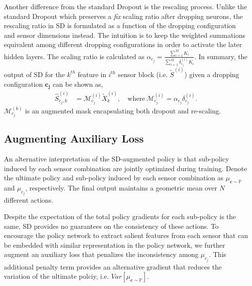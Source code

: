 \documentclass[../thesis.tex]{subfiles}
\begin{document}
Another difference from the standard Dropout is the rescaling process. Unlike the standard Dropout which preserves a \textit{fix} scaling ratio after dropping neurons, the rescaling ratio in SD is formulated as a function of the dropping configuration and sensor dimensions instead. The intuition is to keep the weighted summations equivalent among different dropping configurations in order to activate the later hidden layers. The scaling ratio is calculated as $\alpha_{c_j} = \frac{\sum_{i=1}^M K_i }{\sum_{i=1}^M \delta_{c_j}^{(i)} K_i}.$ In summary, the output of SD for the $k^{th}$ feature in $i^{th}$ sensor block (i.e. $\tilde{S}^{(i)}$) given a dropping configuration $\mathbf{c_j}$ can be shown as,
\begin{align}
\hat{S}^{(i)}_{{c_j},k} &= \mathcal{M}^{(i)}_{c_j} \tilde{X}_k^{(i)}, \ 
&\text{where} \ \mathcal{M}^{(i)}_{c_j} = \alpha_{c_j} \delta_{c_j}^{(i)}. 
\end{align}
$\mathcal{M}^{(k)}_{c_j}$ is an augmented mask encapsulating both dropout and re-scaling. 
 
\subsection{Augmenting Auxiliary Loss}

An alternative interpretation of the SD-augmented policy is that sub-policy induced by each sensor combination are jointly optimized during training. Denote the ultimate policy and sub-policy induced by each sensor combination as $\mu_{\mathbf{c}\sim \mathbb{P}}$ and $\mu_{c_j}$, respectively. The final output maintains a geometric mean over $N$ different actions. 

Despite the expectation of the total policy gradients for each sub-policy is the same, SD provides no guarantees on the consistency of these actions. 
To encourage the policy network to extract salient features from each sensor that can be embedded with similar representation in the policy network, we further augment an auxiliary loss that penalizes the inconsistency among $\mu_{c_j}$. 
This additional penalty term provides an alternative gradient that reduces the variation of the ultimate polciy, i.e. $Var \left[ \mu_{\mathbf{c}\sim \mathbb{P}} \right]$.
\end{document}
